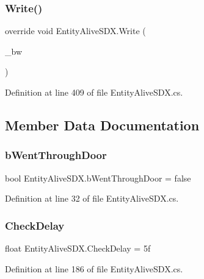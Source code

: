 \subsubsection{\texorpdfstring{Write()}{Write()}}
{\footnotesize\ttfamily override void Entity\+Alive\+S\+D\+X.\+Write (\begin{DoxyParamCaption}\item[{Binary\+Writer}]{\+\_\+bw }\end{DoxyParamCaption})}



Definition at line 409 of file Entity\+Alive\+S\+D\+X.\+cs.



\subsection{Member Data Documentation}
\mbox{\label{class_entity_alive_s_d_x_a4a6cf8d5d3c046a55c407b865a5cb0cd}} 
\subsubsection{\texorpdfstring{bWentThroughDoor}{bWentThroughDoor}}
{\footnotesize\ttfamily bool Entity\+Alive\+S\+D\+X.\+b\+Went\+Through\+Door = false}



Definition at line 32 of file Entity\+Alive\+S\+D\+X.\+cs.

\mbox{\label{class_entity_alive_s_d_x_af77d637b90eb673e8455e2c8ccf969a0}} 
\subsubsection{\texorpdfstring{CheckDelay}{CheckDelay}}
{\footnotesize\ttfamily float Entity\+Alive\+S\+D\+X.\+Check\+Delay = 5f}



Definition at line 186 of file Entity\+Alive\+S\+D\+X.\+cs.

\mbox{\label{class_entity_alive_s_d_x_ac600417d5c1bd818a548275e5c067284}} 
